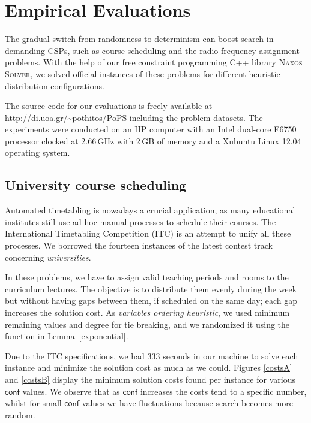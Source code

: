 \documentclass{ws-ijait}
\begin{document}
\section{Empirical Evaluations\label{experiments}}

The gradual switch from randomness to determinism can boost
search in demanding CSPs, such as course scheduling and the
radio frequency assignment problems. With the help of our
free constraint programming C++ library \textsc{Naxos
Solver},\cite{Naxos} we solved official instances of these
problems for different heuristic distribution
configurations.

The source code for our evaluations is freely available at
\url{http://di.uoa.gr/~pothitos/PoPS} including the problem
datasets. The experiments were conducted on an HP computer
with an Intel dual-core E6750 processor clocked at 2.66\,GHz
with 2\,GB of memory and a Xubuntu Linux 12.04 operating
system.

\subsection{University course scheduling\label{ITC}}

Automated timetabling is nowadays a crucial application, as
many educational institutes still use ad hoc manual
processes to schedule their courses. The International
Timetabling Competition (ITC) is an attempt to unify all
these processes. We borrowed the fourteen instances of the
latest contest track concerning
\emph{universities}.\cite{McCollum2010}

In these problems, we have to assign valid teaching periods
and rooms to the curriculum lectures. The objective is to
distribute them evenly during the week but without having
gaps between them, if scheduled on the same day; each gap
increases the solution cost.\cite{Pothitos2012-Scheduling}
As \emph{variables ordering heuristic}, we used minimum
remaining values and degree for tie breaking, and we
randomized it using the function in Lemma~\ref{exponential}.

Due to the ITC specifications, we had 333 seconds in our
machine to solve each instance and minimize the solution
cost as much as we could. Figures \ref{costsA} and
\ref{costsB} display the minimum solution costs found per
instance for various $\mathsf{conf}$ values. We observe that
as $\mathsf{conf}$ increases the costs tend to a specific
number, whilst for small $\mathsf{conf}$ values we have
fluctuations because search becomes more random.
\end{document}

